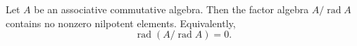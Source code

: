 Let $A$ be an associative commutative algebra. Then the factor algebra $A / \operatorname{rad} A$ contains no nonzero nilpotent elements. Equivalently,
$$
\operatorname{rad}(A / \operatorname{rad} A) = 0.
$$

